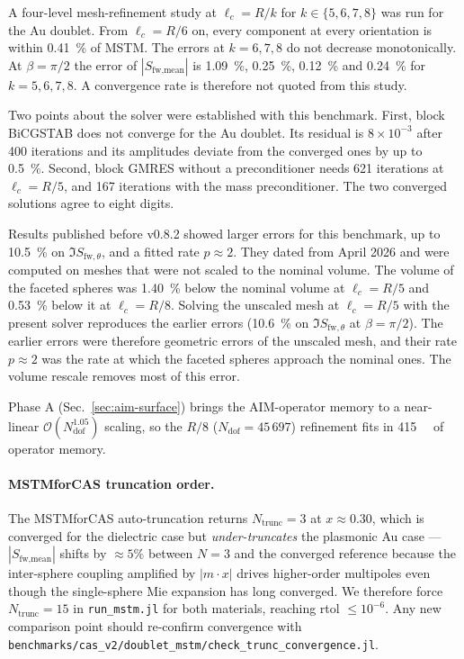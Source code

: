 \documentclass[11pt,a4paper]{article}
\begin{document}
A four-level mesh-refinement study at $\ell_c = R/k$ for
$k \in \{5, 6, 7, 8\}$ was run for the Au doublet.
From $\ell_c = R/6$ on, every component at every orientation is
within \SI{0.41}{\percent} of MSTM.
The errors at $k = 6, 7, 8$ do not decrease monotonically.
At $\beta = \pi/2$ the error of $|S_{\text{fw,mean}}|$ is
\SI{1.09}{\percent}, \SI{0.25}{\percent}, \SI{0.12}{\percent} and
\SI{0.24}{\percent} for $k = 5, 6, 7, 8$.
A convergence rate is therefore not quoted from this study.

Two points about the solver were established with this benchmark.
First, block BiCGSTAB does not converge for the Au doublet.
Its residual is $8 \times 10^{-3}$ after 400 iterations and its
amplitudes deviate from the converged ones by up to
\SI{0.5}{\percent}.
Second, block GMRES without a preconditioner needs 621 iterations at
$\ell_c = R/5$, and 167 iterations with the mass preconditioner.
The two converged solutions agree to eight digits.

Results published before v0.8.2 showed larger errors for this
benchmark, up to \SI{10.5}{\percent} on $\Im S_{\text{fw},\theta}$,
and a fitted rate $p \approx 2$.
They dated from April 2026 and were computed on meshes that were not
scaled to the nominal volume.
The volume of the faceted spheres was \SI{1.40}{\percent} below the
nominal volume at $\ell_c = R/5$ and \SI{0.53}{\percent} below it at
$\ell_c = R/8$.
Solving the unscaled mesh at $\ell_c = R/5$ with the present solver
reproduces the earlier errors (\SI{10.6}{\percent} on
$\Im S_{\text{fw},\theta}$ at $\beta = \pi/2$).
The earlier errors were therefore geometric errors of the unscaled
mesh, and their rate $p \approx 2$ was the rate at which the faceted
spheres approach the nominal ones.
The volume rescale removes most of this error.

Phase A (Sec.~\ref{sec:aim-surface}) brings the AIM-operator memory to
a near-linear $\mathcal{O}(N_{\text{dof}}^{1.05})$ scaling, so the
$R/8$ ($N_{\text{dof}} = 45\,697$) refinement fits in
\SI{415}{\mebi\byte} of operator memory.

\paragraph{MSTMforCAS truncation order.} The MSTMforCAS
auto-truncation returns $N_{\text{trunc}} = 3$ at
$x \approx 0.30$, which is converged for the dielectric case but
\emph{under-truncates} the plasmonic Au case --- $|S_{\text{fw,mean}}|$
shifts by $\approx 5\%$ between $N = 3$ and the converged reference
because the inter-sphere coupling amplified by $|m\!\cdot\!x|$
drives higher-order multipoles even though the single-sphere Mie
expansion has long converged.  We therefore force
$N_{\text{trunc}} = 15$ in \texttt{run\_mstm.jl} for both materials,
reaching rtol $\leq 10^{-6}$.  Any new comparison point should
re-confirm convergence with
\texttt{benchmarks/cas\_v2/doublet\_mstm/check\_trunc\_\allowbreak convergence.jl}.
\end{document}
